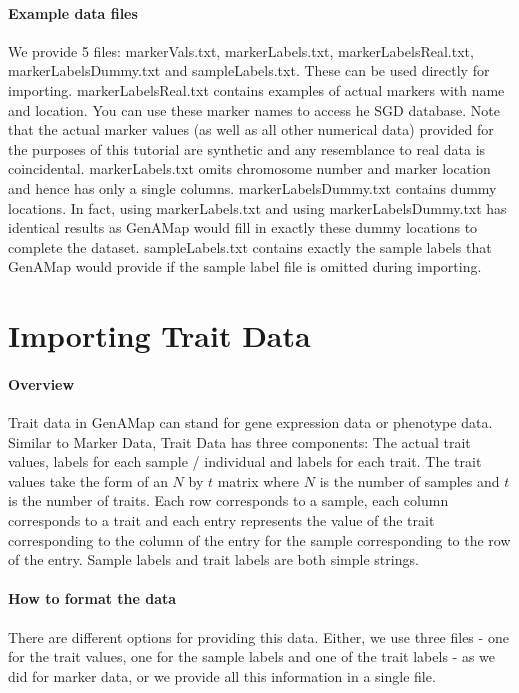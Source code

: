 \documentclass{article}
\begin{document}
\paragraph{Example data files} We provide 5 files: markerVals.txt, markerLabels.txt, markerLabelsReal.txt, markerLabelsDummy.txt and sampleLabels.txt. These can be used directly for importing. markerLabelsReal.txt contains examples of actual markers with name and location. You can use these marker names to access he SGD database. Note that the actual marker values (as well as all other numerical data) provided for the purposes of this tutorial are synthetic and any resemblance to real data is coincidental. markerLabels.txt omits chromosome number and marker location and hence has only a single columns. markerLabelsDummy.txt contains dummy locations. In fact, using markerLabels.txt and using markerLabelsDummy.txt has identical results as GenAMap would fill in exactly these dummy locations to complete the dataset. sampleLabels.txt contains exactly the sample labels that GenAMap would provide if the sample label file is omitted during importing.

\section{Importing Trait Data}

\paragraph{Overview} Trait data in GenAMap can stand for gene expression data or phenotype data. Similar to Marker Data, Trait Data has three components: The actual trait values, labels for each sample / individual and labels for each trait. The trait values take the form of an $N$ by $t$ matrix where $N$ is the number of samples and $t$ is the number of traits. Each row corresponds to a sample, each column corresponds to a trait and each entry represents the value of the trait corresponding to the column of the entry for the sample corresponding to the row of the entry. Sample labels and trait labels are both simple strings.

\paragraph{How to format the data} There are different options for providing this data. Either, we use three files - one for the trait values, one for the sample labels and one of the trait labels - as we did for marker data, or we provide all this information in a single file. \\
\end{document}
